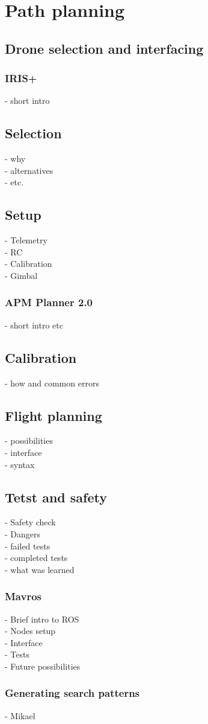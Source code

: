 \chapter{Path planning}

\section{Drone selection and interfacing}

\subsection{IRIS+}
- short intro\\
\section{Selection} 
- why\\
- alternatives\\
- etc.\\
\section{Setup}
- Telemetry\\
- RC\\
- Calibration\\
- Gimbal\\
\subsection{APM Planner 2.0}
- short intro etc \\
\section{Calibration}
- how and common errors\\
\section{Flight planning}
- possibilities\\
- interface\\
- syntax\\
\section{Tetst and safety}
- Safety check\\
- Dangers\\
- failed tests\\
- completed tests\\
- what was learned\\

\subsection{Mavros}
- Brief intro to ROS\\
- Nodes setup\\
- Interface\\
- Tests\\
- Future possibilities\\
\subsection{Generating search patterns}
- Mikael\\
\newpage